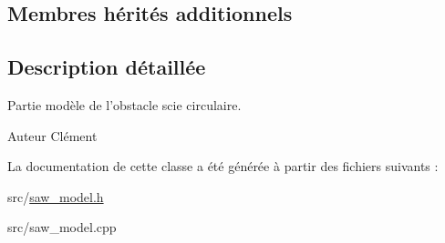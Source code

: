 \subsection*{Membres hérités additionnels}


\subsection{Description détaillée}
Partie modèle de l'obstacle scie circulaire. 

\begin{DoxyAuthor}{Auteur}
Clément 
\end{DoxyAuthor}


La documentation de cette classe a été générée à partir des fichiers suivants \+:\begin{DoxyCompactItemize}
\item 
src/\hyperlink{saw__model_8h}{saw\+\_\+model.\+h}\item 
src/saw\+\_\+model.\+cpp\end{DoxyCompactItemize}
